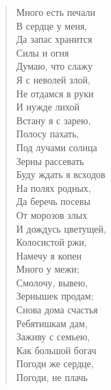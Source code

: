 \begin{verse}
\begin{altverse}
Много есть печали\\
В сердце у меня,\\
Да запас хранится\\
Силы и огня\ldotst\\
Думаю, что слажу\\
Я с неволей злой,\\
Не отдамся в руки\\
И нужде лихой\ldotst\\
Встану я с зарею,\\
Полосу пахать,\\
Под лучами солнца\\
Зерны рассевать\ldotst\\
Буду ждать я всходов\\
На полях родных,\\
Да беречь посевы\\
От морозов злых\ldotst\\
И дождусь цветущей,\\
Колосистой ржи,\\
Намечу я копен\\
Много у межи;\\
Смолочу, вывею,\\
Зернышек продам;\\
Снова дома счастья\\
Ребятишкам дам,\\
Заживу с семьею,\\
Как большой богач\ldotst\\
Погоди же сердце,\\
Погоди, не плачь\ldotst
\end{altverse}
\end{verse}

\newpage
\vspace*{0cm}


